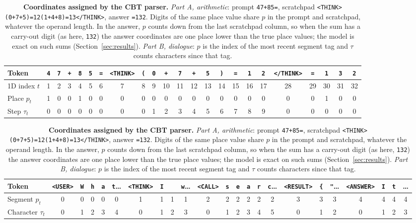 \documentclass[10pt,twocolumn]{article}
\begin{document}
\begin{table}[!t]
\centering
\scriptsize
\setlength{\tabcolsep}{2.2pt}
\caption{\textbf{Coordinates assigned by the CBT parser.} \emph{Part A, arithmetic}: prompt \texttt{47+85=}, scratchpad \texttt{<THINK>(0+7+5)=12(1+4+8)=13</THINK>}, answer \texttt{=132}. Digits of the same place value share $p$ in the prompt and scratchpad, whatever the operand length. In the answer, $p$ counts down from the last scratchpad column, so when the sum has a carry-out digit (as here, \texttt{132}) the answer coordinates are one place lower than the true place values; the model is exact on such sums (Section~\ref{sec:results}). \emph{Part B, dialogue}: $p$ is the index of the most recent segment tag and $\tau$ counts characters since that tag.}\label{tab:coords}
\begin{tabular}{lcccccccccccccccccccccc}
\toprule
Token & \texttt{4} & \texttt{7} & \texttt{+} & \texttt{8} & \texttt{5} & \texttt{=} & \texttt{<THINK>} & \texttt{(} & \texttt{0} & \texttt{+} & \texttt{7} & \texttt{+} & \texttt{5} & \texttt{)} & \texttt{=} & \texttt{1} & \texttt{2} & \texttt{</THINK>} & \texttt{=} & \texttt{1} & \texttt{3} & \texttt{2} \\
\midrule
1D index $t$ & 1 & 2 & 3 & 4 & 5 & 6 & 7 & 8 & 9 & 10 & 11 & 12 & 13 & 14 & 15 & 16 & 17 & 28 & 29 & 30 & 31 & 32 \\
Place $p_t$ & 1 & 0 & 0 & 1 & 0 & 0 & 0 & 0 & 0 & 0 & 0 & 0 & 0 & 0 & 0 & 0 & 0 & 0 & 0 & 1 & 0 & 0 \\
Step $\tau_t$ & 0 & 0 & 0 & 0 & 0 & 0 & 0 & 0 & 1 & 2 & 3 & 4 & 5 & 6 & 7 & 8 & 9 & 0 & 0 & 0 & 0 & 0 \\
\bottomrule
\end{tabular}\par\vspace{6pt}
\begin{tabular}{lcccccccccccccccccccccc}
\toprule
Token & \texttt{<USER>} & \texttt{W} & \texttt{h} & \texttt{a} & \texttt{t}\ldots & \texttt{<THINK>} & \texttt{I} & \texttt{\ } & \texttt{w}\ldots & \texttt{<CALL>} & \texttt{s} & \texttt{e} & \texttt{a} & \texttt{r} & \texttt{c}\ldots & \texttt{<RESULT>} & \texttt{\{} & \texttt{"}\ldots & \texttt{<ANSWER>} & \texttt{I} & \texttt{t} & \ldots \\
\midrule
Segment $p_t$ & 0 & 0 & 0 & 0 & 0 & 1 & 1 & 1 & 1 & 2 & 2 & 2 & 2 & 2 & 2 & 3 & 3 & 3 & 4 & 4 & 4 & 4 \\
Character $\tau_t$ & 0 & 1 & 2 & 3 & 4 & 0 & 1 & 2 & 3 & 0 & 1 & 2 & 3 & 4 & 5 & 0 & 1 & 2 & 0 & 1 & 2 & 3 \\
\bottomrule
\end{tabular}
\end{table}
\end{document}
